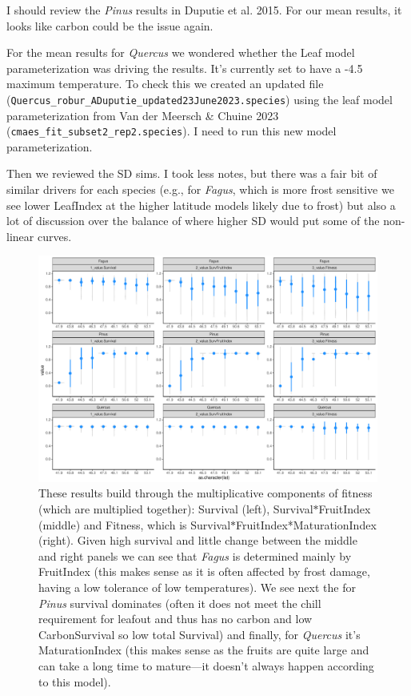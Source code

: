 \documentclass[11pt,letter]{article}
\begin{document}
I should review the \emph{Pinus} results in Duputie et al. 2015. For our mean results, it looks like carbon could be the issue again. 

For the mean results for \emph{Quercus} we wondered whether the Leaf model parameterization was driving the results. It's currently set to have a -4.5 maximum temperature. To check this we created an updated file (\verb|Quercus_robur_ADuputie_updated23June2023.species|) using the leaf model parameterization from Van der Meersch \& Chuine 2023 (\verb|cmaes_fit_subset2_rep2.species|). I need to run this new model parameterization.

Then we reviewed the SD sims. I took less notes, but there was a fair bit of similar drivers for each species (e.g., for \emph{Fagus}, which is more frost sensitive we see lower LeafIndex at the higher latitude models likely due to frost) but also a lot of discussion over the balance of where higher SD would put some of the non-linear curves. 

\begin{figure} 
 \begin{center}
\noindent \includegraphics[width=1\textwidth]{..//analyses/graphs/phenofit/historical/fitnessBuildup.pdf}
  \caption{These results build through the multiplicative components of fitness (which are multiplied together): Survival (left), Survival$*$FruitIndex (middle) and Fitness, which is Survival$*$FruitIndex*MaturationIndex (right). Given high survival and little change between the middle and right panels we can see that \emph{Fagus} is determined mainly by FruitIndex (this makes sense as it is often affected by frost damage, having a low tolerance of low temperatures). We see next the for \emph{Pinus} survival dominates (often it does not meet the chill requirement for leafout and thus has no carbon and low CarbonSurvival so low total Survival) and finally, for \emph{Quercus} it's MaturationIndex (this makes sense as the fruits are quite large and can take a long time to mature---it doesn't always happen according to this model). }
  \label{fig:historicalfitnessl}
  \end{center}
\end{figure}
\end{document}

